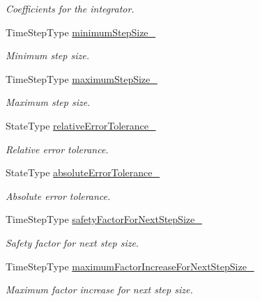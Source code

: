 \begin{DoxyCompactItemize}
\begin{DoxyCompactList}\small\item\em Coefficients for the integrator. \end{DoxyCompactList}\item 
Time\+Step\+Type \hyperlink{classtudat_1_1numerical__integrators_1_1RungeKuttaVariableStepSizeIntegrator_a7055fda3b282fa93820597e2e7ee1f81}{minimum\+Step\+Size\+\_\+}
\begin{DoxyCompactList}\small\item\em Minimum step size. \end{DoxyCompactList}\item 
Time\+Step\+Type \hyperlink{classtudat_1_1numerical__integrators_1_1RungeKuttaVariableStepSizeIntegrator_ac8bdeabe449addaf3dd481396dc71481}{maximum\+Step\+Size\+\_\+}
\begin{DoxyCompactList}\small\item\em Maximum step size. \end{DoxyCompactList}\item 
State\+Type \hyperlink{classtudat_1_1numerical__integrators_1_1RungeKuttaVariableStepSizeIntegrator_ab5106397b1ac1265bbff90dd61d5fa6d}{relative\+Error\+Tolerance\+\_\+}
\begin{DoxyCompactList}\small\item\em Relative error tolerance. \end{DoxyCompactList}\item 
State\+Type \hyperlink{classtudat_1_1numerical__integrators_1_1RungeKuttaVariableStepSizeIntegrator_aac2980ff2ed5a6a44333cf7843b7fa39}{absolute\+Error\+Tolerance\+\_\+}
\begin{DoxyCompactList}\small\item\em Absolute error tolerance. \end{DoxyCompactList}\item 
Time\+Step\+Type \hyperlink{classtudat_1_1numerical__integrators_1_1RungeKuttaVariableStepSizeIntegrator_aaf907ca159430a0419af1303d308679a}{safety\+Factor\+For\+Next\+Step\+Size\+\_\+}
\begin{DoxyCompactList}\small\item\em Safety factor for next step size. \end{DoxyCompactList}\item 
Time\+Step\+Type \hyperlink{classtudat_1_1numerical__integrators_1_1RungeKuttaVariableStepSizeIntegrator_ab8745acd627400550b7e00c1ba6c12dd}{maximum\+Factor\+Increase\+For\+Next\+Step\+Size\+\_\+}
\begin{DoxyCompactList}\small\item\em Maximum factor increase for next step size. \end{DoxyCompactList}\item 

\end{DoxyCompactItemize}
